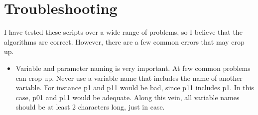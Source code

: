 \documentclass[11pt]{article}
\begin{document}
\section{Troubleshooting}
I have tested these scripts over a wide range of problems, so I believe that the algorithms are correct. However, there are a few common errors that may crop up.
\begin{itemize}
\item Variable and parameter naming is very important. At few common problems can crop up. Never use a variable name that includes the name of another variable. For instance p1 and p11 would be bad, since p11 includes p1. In this case, p01 and p11 would be adequate. Along this vein, all variable names should be at least 2 characters long, just in case.
\end{itemize}
\end{document}
